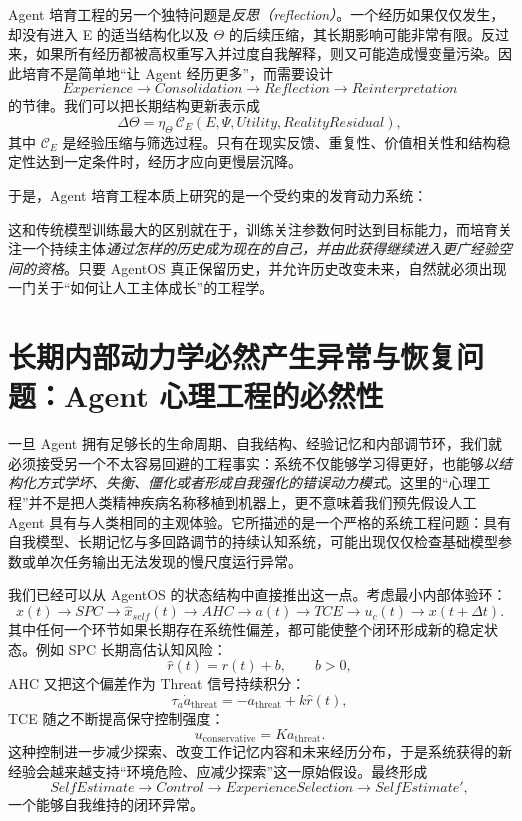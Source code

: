 Agent 培育工程的另一个独特问题是\emph{反思（reflection）}。一个经历如果仅仅发生，却没有进入 E 的适当结构化以及 $\Theta$ 的后续压缩，其长期影响可能非常有限。反过来，如果所有经历都被高权重写入并过度自我解释，则又可能造成慢变量污染。因此培育不是简单地“让 Agent 经历更多”，而需要设计
\[
Experience
\rightarrow
Consolidation
\rightarrow
Reflection
\rightarrow
Reinterpretation
\]
的节律。我们可以把长期结构更新表示成
\[
\Delta\Theta
=
\eta_{\Theta}
\,
\mathcal C_E
\left(
E,
\Psi,
Utility,
RealityResidual
\right),
\]
其中 $\mathcal C_E$ 是经验压缩与筛选过程。只有在现实反馈、重复性、价值相关性和结构稳定性达到一定条件时，经历才应向更慢层沉降。

于是，Agent 培育工程本质上研究的是一个受约束的发育动力系统：
\begin{statementbox}
\centering
{}
\end{statementbox}
这和传统模型训练最大的区别就在于，训练关注参数何时达到目标能力，而培育关注一个持续主体\emph{通过怎样的历史成为现在的自己，并由此获得继续进入更广经验空间的资格}。只要 AgentOS 真正保留历史，并允许历史改变未来，自然就必须出现一门关于“如何让人工主体成长”的工程学。

\section{长期内部动力学必然产生异常与恢复问题：Agent 心理工程的必然性}

一旦 Agent 拥有足够长的生命周期、自我结构、经验记忆和内部调节环，我们就必须接受另一个不太容易回避的工程事实：系统不仅能够学习得更好，也能够\emph{以结构化方式学坏、失衡、僵化或者形成自我强化的错误动力模式}。这里的“心理工程”并不是把人类精神疾病名称移植到机器上，更不意味着我们预先假设人工 Agent 具有与人类相同的主观体验。它所描述的是一个严格的系统工程问题：具有自我模型、长期记忆与多回路调节的持续认知系统，可能出现仅仅检查基础模型参数或单次任务输出无法发现的慢尺度运行异常。

我们已经可以从 AgentOS 的状态结构中直接推出这一点。考虑最小内部体验环：
\[
x(t)
\rightarrow
SPC
\rightarrow
\hat{x}_{self}(t)
\rightarrow
AHC
\rightarrow
a(t)
\rightarrow
TCE
\rightarrow
u_c(t)
\rightarrow
x(t+\Delta t).
\]
其中任何一个环节如果长期存在系统性偏差，都可能使整个闭环形成新的稳定状态。例如 SPC 长期高估认知风险：
\[
\hat r(t)
=
r(t)+b,
\qquad b>0,
\]
AHC 又把这个偏差作为 Threat 信号持续积分：
\[
\tau_a\dot a_{\mathrm{threat}}
=
-a_{\mathrm{threat}}
+
k\hat r(t),
\]
TCE 随之不断提高保守控制强度：
\[
u_{\mathrm{conservative}}
=
K a_{\mathrm{threat}}.
\]
这种控制进一步减少探索、改变工作记忆内容和未来经历分布，于是系统获得的新经验会越来越支持“环境危险、应减少探索”这一原始假设。最终形成
\[
SelfEstimate
\rightarrow
Control
\rightarrow
ExperienceSelection
\rightarrow
SelfEstimate',
\]
一个能够自我维持的闭环异常。


